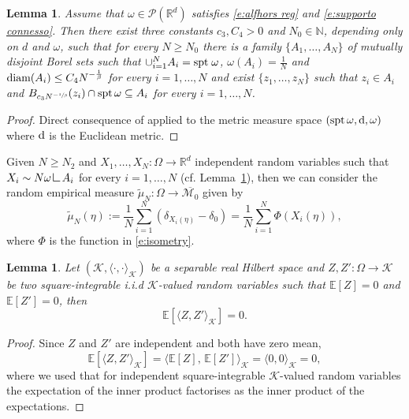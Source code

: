\documentclass[12pt,a4paper,oneside]{amsart}
\theoremstyle{plain}
\newtheorem{lemma}[theorem]{Lemma}
\theoremstyle{definition}
\numberwithin{equation}{section}
\numberwithin{figure}{section}
\numberwithin{table}{section}
\theoremstyle{remark}
\newcommand{\R}{\mathbb{R}}
\newcommand{\N}{\mathbb{N}}
\newcommand{\diam}{\textup{diam}}
\newcommand\res{\mathop{\hbox{\vrule height 7pt width .5pt depth 0pt \vrule height .5pt width 6pt depth 0pt}}\nolimits}
\newcommand{\expAhlfors}{\beta}
\begin{document}
\begin{lemma}\label{l:Gigante-Leopardi}
Assume that $\omega\in \mathcal{P}(\R^d)$ satisfies \eqref{e:alfhors reg} and \eqref{e:supporto connesso}.
Then there exist three constants $c_3,C_4>0$ and $N_0\in \N$, depending only on $d$ and $\omega$, such that for every $N\geq N_0$ there is a family $\{A_1,\dots, A_N\}$ of mutually disjoint Borel sets such that $\cup_{i=1}^NA_i = \textup{spt} \; \omega$, $\omega(A_i)=\frac1N$ and $\diam(A_i)\leq C_4 N^{-\frac1\expAhlfors}$ for every $i=1,\dots,N$ and exist $\{z_1,\dots,z_N\}$ such that $z_i\in A_i$ and $B_{c_3 N^{-\sfrac1\expAhlfors}}(z_i)\cap \mathrm{spt}\, \omega \subseteq A_i$ for every $i=1,\dots,N$.
\end{lemma}

\begin{proof}
Direct consequence of \cite[Theorem 2]{GL17} applied to the metric measure space $(\mathrm{spt}\, \omega, \textup{d}, \omega)$ where $\textup{d}$ is the Euclidean metric.
\end{proof}

Given $N\geq N_2$ and $X_1,\dots,X_N :\Omega \to \R^d$ independent random variables such that $X_i \sim N\omega \res A_i $ for every $i=1,\dots,N$ (cf. Lemma~\ref{l:Gigante-Leopardi}), then we can consider the random empirical measure $\tilde{\mu}_N: \Omega \to \overline{\mathcal{M}_0}$ given by
\begin{equation}\label{e:random empirical}
    \tilde{\mu}_N(\eta):=\frac1N\sum_{i=1}^N (\delta_{X_i(\eta)}-\delta_0)=\frac1N\sum_{i=1}^N\Phi(X_i(\eta)),
\end{equation}
where $\Phi$ is the function in \eqref{e:isometry}.

\begin{lemma}\label{l:polarity}
Let $(\mathcal{K},\langle\cdot,\cdot\rangle_{\mathcal{K}})$ be a separable real Hilbert space and $Z,Z':\Omega \to \mathcal{K}$ be two square-integrable i.i.d $\mathcal{K}$-valued random variables
such that $\mathbb{E}[Z]=0$ and $\mathbb{E}[Z']=0$,  then
\begin{equation*}
\mathbb{E}[\langle Z,Z'\rangle_{\mathcal{K}}]=0.    
\end{equation*}
\end{lemma}

\begin{proof}
Since $Z$ and $Z'$ are independent and both have zero mean,
\begin{equation*}
\mathbb{E}[\langle Z, Z'\rangle_{\mathcal{K}}]
= \langle \mathbb{E}[Z],\, \mathbb{E}[Z']\rangle_{\mathcal{K}}
= \langle 0, 0 \rangle_{\mathcal{K}} = 0,
\end{equation*}
where we used that for independent square-integrable $\mathcal{K}$-valued
random variables the expectation of the inner product factorises as the
inner product of the expectations.
\end{proof}
\end{document}
